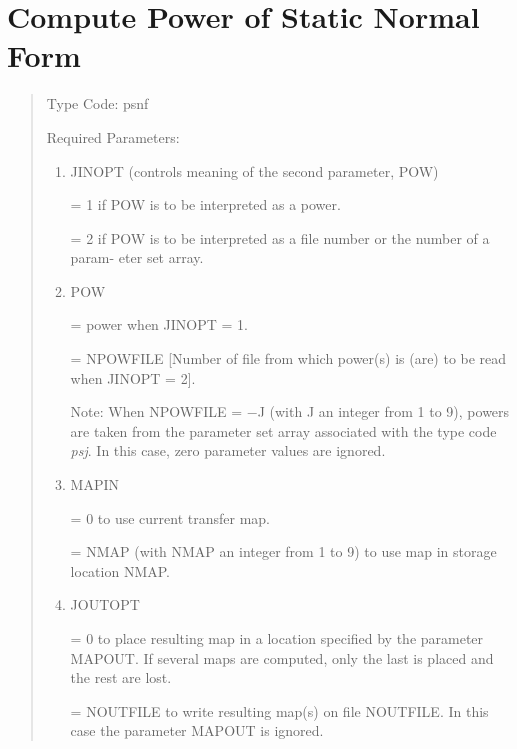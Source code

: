 \section{Compute Power of Static Normal Form}
\begin{quotation}
\noindent     Type Code:  psnf 
\vspace{5mm}

\noindent Required Parameters:
\begin{enumerate}
      \item  JINOPT (controls meaning of the second parameter, POW)

             = 1 if POW is to be interpreted as a power.

             = 2 if POW is to be interpreted as a file number or the number
               of a param- \hspace*{1em}eter set array.

      \item  POW

             = power when JINOPT = 1.

             = NPOWFILE [Number of file from which power(s) is (are) to be
               read when \hspace*{1em}JINOPT = 2].

             Note:  When NPOWFILE = $-$J (with J an integer from 1 to 9),
             powers are taken from the parameter set array associated with
             the type code {\em psj}.  In this case, zero parameter values are
             ignored.


      \item  MAPIN

             = 0 to use current transfer map.

             = NMAP (with NMAP an integer from 1 to 9) to use map in
               storage location \hspace*{1em}NMAP.

      \item  JOUTOPT

             = 0 to place resulting map in a location specified by the
               parameter \linebreak \hspace*{1em}MAPOUT.  If several maps are computed,
               only the last is placed and \hspace*{1em}the rest are lost.

             = NOUTFILE to write resulting map(s) on file NOUTFILE.  In
               this case \hspace*{1em}the parameter MAPOUT is ignored.


\end{enumerate}
\end{quotation}
